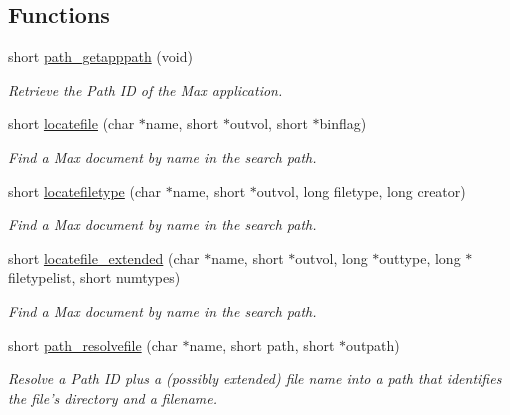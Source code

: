 \subsection*{Functions}
\begin{DoxyCompactItemize}
\item 
short \hyperlink{group__files_gafa1b5d658654eb52b748c0b94200f393}{path\_\-getapppath} (void)
\begin{DoxyCompactList}\small\item\em Retrieve the Path ID of the Max application. \item\end{DoxyCompactList}\item 
short \hyperlink{group__files_ga4d2637351d4a98b83e9a59ef7d500568}{locatefile} (char $\ast$name, short $\ast$outvol, short $\ast$binflag)
\begin{DoxyCompactList}\small\item\em Find a Max document by name in the search path. \item\end{DoxyCompactList}\item 
short \hyperlink{group__files_ga8f43f2c9eb53933bbf354997eebb495d}{locatefiletype} (char $\ast$name, short $\ast$outvol, long filetype, long creator)
\begin{DoxyCompactList}\small\item\em Find a Max document by name in the search path. \item\end{DoxyCompactList}\item 
short \hyperlink{group__files_gaa2899b66e1457da0ee333f9407230ccd}{locatefile\_\-extended} (char $\ast$name, short $\ast$outvol, long $\ast$outtype, long $\ast$filetypelist, short numtypes)
\begin{DoxyCompactList}\small\item\em Find a Max document by name in the search path. \item\end{DoxyCompactList}\item 
short \hyperlink{group__files_gaa6b2d2754cc0ba75a93deb186d326be8}{path\_\-resolvefile} (char $\ast$name, short path, short $\ast$outpath)
\begin{DoxyCompactList}\small\item\em Resolve a Path ID plus a (possibly extended) file name into a path that identifies the file’s directory and a filename. \item\end{DoxyCompactList}\item 

\end{DoxyCompactItemize}
